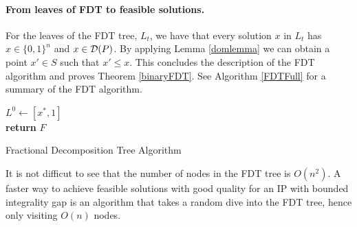 	\paragraph{From leaves of FDT to feasible solutions.}
	For the leaves of the FDT tree,  $L_t$, we have that every solution $x$ in $L_t$ has $x\in\{0,1\}^n$ and $x\in \operatorname{\mathcal{D}}(P)$. By applying Lemma \ref{domlemma} we can obtain a point $x'\in S$ such that $x'\leq x$. This concludes the description of the FDT algorithm and proves Theorem \ref{binaryFDT}. See Algorithm \ref{FDTFull} for a summary of the FDT algorithm.
	
	\vspace*{8pt}
	
	
	\begin{algorithm}[H]\label{FDTFull}
		$L^0\leftarrow [x^*,1]$\\
		\textbf{return} $F$
		\caption{Fractional Decomposition Tree Algorithm}
	\end{algorithm}
	
	
\vspace{8pt}
It is not difficut to see that the number of nodes in the FDT tree is $O(n^2)$. A faster way to achieve feasible solutions with good quality for an IP with bounded integrality gap is an algorithm that takes a random dive into the FDT tree, hence only visiting $O(n)$ nodes. 

	
	\vspace*{8pt}
	
